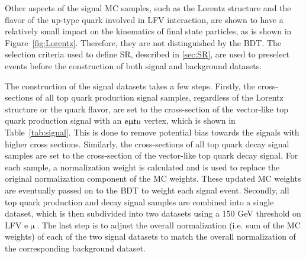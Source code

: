 Other aspects of the signal \ac{MC} samples, such as the Lorentz structure and the flavor of the up-type quark involved in LFV interaction, are shown to have a relatively small impact on the kinematics of final state particles, as is shown in Figure~\ref{fig:Lorentz}. Therefore, they are not distinguished by the \ac{BDT}. The selection criteria used to define \ac{SR}, described in \autoref{sec:SR}, are used to preselect events before the construction of both signal and background datasets. 

The construction of the signal datasets takes a few steps. Firstly, the cross-sections of all top quark production signal samples, regardless of the Lorentz structure or the quark flavor, are set to the cross-section of the vector-like top quark production signal with an $\textsf{e}\upmu\textsf{t{u}}$ vertex, which is shown in Table~\ref{tab:signal}. This is done to remove potential bias towards the signals with higher cross sections. Similarly, the cross-sections of all top quark decay signal samples are set to the cross-section of the vector-like top quark decay signal. For each sample, a normalization weight is calculated and is used to replace the original normalization component of the \ac{MC} weights. These updated \ac{MC} weights are eventually passed on to the \ac{BDT} to weight each signal event. Secondly, all top quark production and decay signal samples are combined into a single dataset, which is then subdivided into two datasets using a 150 GeV threshold on LFV e$\upmu$. The last step is to adjust the overall normalization (i.e. sum of the \ac{MC} weights) of each of the two signal datasets to match the overall normalization of the corresponding background dataset. 

